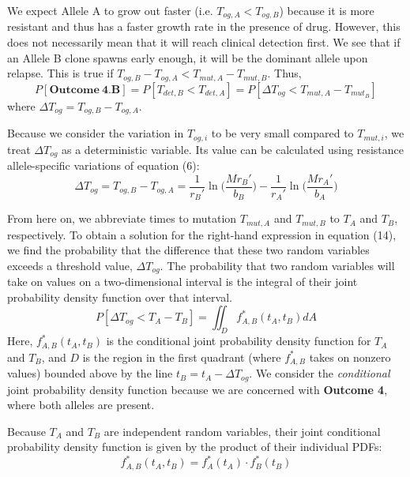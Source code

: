 \documentclass{article}
\begin{document}
We expect Allele A to grow out faster (i.e. $T_{og,A} < T_{og,B}$) because it is more resistant and thus has a faster growth rate in the presence of drug.  However, this does not necessarily mean that it will reach clinical detection first.  We see that if an Allele B clone spawns early enough, it will be the dominant allele upon relapse.  This is true if $T_{og,B}-T_{og,A} < T_{mut,A}-T_{mut,B}$.  Thus,
\begin{equation}
P[\mathbf{Outcome\:4.B}] = P[T_{det,B} < T_{det,A}] = P[\Delta T_{og} < T_{mut,A} - T_{mut_B}]
\end{equation}
where $\Delta T_{og} = T_{og,B}-T_{og,A}$.

Because we consider the variation in $T_{og,i}$ to be very small compared to $T_{mut,i}$, we treat $\Delta T_{og}$ as a deterministic variable.  Its value can be calculated using resistance allele-specific variations of equation (6):
\begin{equation}
\Delta T_{og} = T_{og,B}-T_{og,A} = \frac{1}{r_B'}\ln\Big(\frac{Mr_B'}{b_B}\Big) - \frac{1}{r_A'}\ln\Big(\frac{Mr_A'}{b_A}\Big)
\end{equation}

From here on, we abbreviate times to mutation $T_{mut,A}$ and $T_{mut,B}$ to $T_A$ and $T_B$, respectively.  To obtain a solution for the right-hand expression in equation (14), we find the probability that the difference that these two random variables exceeds a threshold value, $\Delta T_{og}$.  The probability that two random variables will take on values on a two-dimensional interval is the integral of their joint probability density function over that interval.
\begin{equation}
P[\Delta T_{og} < T_{A} - T_{B}] = \iint_D f_{A,B}^*(t_{A},t_{B})dA
\end{equation}
Here, $f_{A,B}^*(t_{A},t_{B})$ is the conditional joint probability density function for $T_{A}$ and $T_{B}$, and $D$ is the region in the first quadrant (where $f_{A,B}^*$ takes on nonzero values) bounded above by the line $t_{B} = t_{A}-\Delta T_{og}$.  We consider the \textit{conditional} joint probability density function because we are concerned with \textbf{Outcome 4}, where both alleles are present.

Because $T_{A}$ and $T_{B}$ are independent random variables, their joint conditional probability density function is given by the product of their individual PDFs:
\begin{equation}
f_{A,B}^*(t_{A},t_{B}) = f_{A}^*(t_{A}) \cdot  f_B^*(t_{B})
\end{equation}
\end{document}
